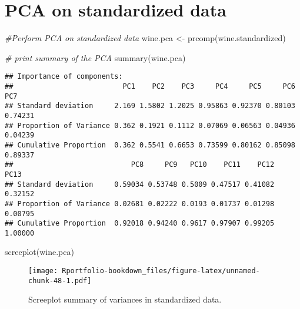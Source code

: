 \documentclass[
]{book}
\newenvironment{Shaded}{\begin{snugshade}}{\end{snugshade}}
\newcommand{\CommentTok}[1]{\textcolor[rgb]{0.56,0.35,0.01}{\textit{#1}}}
\newcommand{\FunctionTok}[1]{\textcolor[rgb]{0.00,0.00,0.00}{#1}}
\newcommand{\NormalTok}[1]{#1}
\newcommand{\OtherTok}[1]{\textcolor[rgb]{0.56,0.35,0.01}{#1}}
\newcommand{\SpecialCharTok}[1]{\textcolor[rgb]{0.00,0.00,0.00}{#1}}
\begin{document}
\hypertarget{pca-on-standardized-data}{%
\section{PCA on standardized data}\label{pca-on-standardized-data}}

\begin{Shaded}
\begin{Highlighting}[]
\CommentTok{\#Perform PCA on standardized data}
\NormalTok{wine.pca }\OtherTok{\textless{}{-}} \FunctionTok{prcomp}\NormalTok{(wine.standardized)}

\CommentTok{\# print summary of the PCA}
\FunctionTok{summary}\NormalTok{(wine.pca)}
\end{Highlighting}
\end{Shaded}

\begin{verbatim}
## Importance of components:
##                          PC1    PC2    PC3     PC4     PC5     PC6     PC7
## Standard deviation     2.169 1.5802 1.2025 0.95863 0.92370 0.80103 0.74231
## Proportion of Variance 0.362 0.1921 0.1112 0.07069 0.06563 0.04936 0.04239
## Cumulative Proportion  0.362 0.5541 0.6653 0.73599 0.80162 0.85098 0.89337
##                            PC8     PC9   PC10    PC11    PC12    PC13
## Standard deviation     0.59034 0.53748 0.5009 0.47517 0.41082 0.32152
## Proportion of Variance 0.02681 0.02222 0.0193 0.01737 0.01298 0.00795
## Cumulative Proportion  0.92018 0.94240 0.9617 0.97907 0.99205 1.00000
\end{verbatim}

\begin{Shaded}
\begin{Highlighting}[]
\FunctionTok{screeplot}\NormalTok{(wine.pca)}
\end{Highlighting}
\end{Shaded}

\begin{figure}
\centering
\texttt{[image: Rportfolio-bookdown\_files/figure-latex/unnamed-chunk-48-1.pdf]}
\caption{\label{fig:unnamed-chunk-48}Screeplot summary of variances in standardized data.}
\end{figure}

\begin{Shaded}
\end{Shaded}
\end{document}
